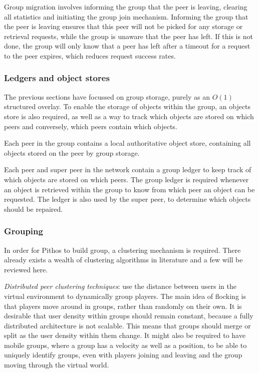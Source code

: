 Group migration involves informing the group that the peer is leaving, clearing all statistics and initiating the group join mechanism. Informing the group that the peer is leaving ensures that this peer will not be picked for any storage or retrieval requests, while the group is unaware that the peer has left. If this is not done, the group will only know that a peer has left after a timeout for a request to the peer expires, which reduces request success rates.

\subsubsection{Ledgers and object stores}

The previous sections have focussed on group storage, purely as an $O(1)$ structured overlay. To enable the storage of objects within the group, an objects store is also required, as well as a way to track which objects are stored on which peers and conversely, which peers contain which objects.

Each peer in the group contains a local authoritative object store, containing all objects stored on the peer by group storage.

Each peer and super peer in the network contain a group ledger to keep track of which objects are stored on which peers. The group ledger is required whenever an object is retrieved within the group to know from which peer an object can be requested. The ledger is also used by the super peer, to determine which objects should be repaired.

\subsubsection{Grouping}
\label{grouping_design}

In order for Pithos to build group, a clustering mechanism is required. There already exists a wealth of clustering algorithms in literature and a few will be reviewed here.

\emph{Distributed peer clustering techniques}: use the distance between users in the virtual environment to dynamically group players. The main idea of flocking is that players move around in groups, rather than randomly on their own. It is desirable that user density within groups should remain constant, because a fully distributed architecture is not scalable. This means that groups should merge or split as the user density within them change. It might also be required to have mobile groups, where a group has a velocity as well as a position, to be able to uniquely identify groups, even with players joining and leaving and the group moving through the virtual world.

